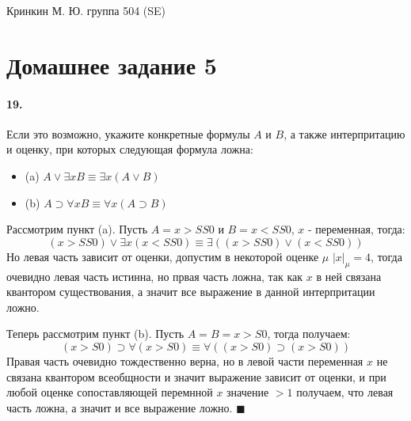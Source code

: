 \documentclass[a4paper,12pt]{article}
\begin{document}
\sloppy

\lstset{
	basicstyle=\small,
	stringstyle=\ttfamily,
	showstringspaces=false,
	columns=fixed,
	breaklines=true,
	numbers=right,
	numberstyle=\tiny
}

\newtheorem{Def}{Определение}[section]
\newtheorem{Th}{Теорема}
\newtheorem{Lem}[Th]{Лемма}
\newenvironment{Proof}
	{\par\noindent{\bf Доказательство.}}
	{\hfill$\scriptstyle\blacksquare$}
\newenvironment{Solution}
	{\par\noindent{\bf Решение.}}
	{\hfill$\scriptstyle\blacksquare$}


\begin{flushright}
	Кринкин М. Ю. группа 504 (SE)
\end{flushright}

\section{Домашнее задание 5}

\paragraph{19.} Если это возможно, укажите конкретные формулы $A$ и $B$, а также интерпритацию и оценку, при которых следующая формула ложна:

\begin{itemize}
\item (a) $A \lor \exists x B \equiv \exists x \left(A \lor B\right)$

\item (b) $A \supset \forall x B \equiv \forall x \left(A \supset B\right)$
\end{itemize}

\begin{Solution}
Рассмотрим пункт (a). Пусть $A = x > SS0$ и $B = x < SS0$, $x$ - переменная, тогда:
\[
	\left(x>SS0\right)\lor\exists x \left(x<SS0\right)\equiv\exists \left(\left(x>SS0\right)\lor\left(x<SS0\right)\right)
\]
Но левая часть зависит от оценки, допустим в некоторой оценке $\mu$ $\left|x\right|_{\mu} = 4$, тогда очевидно левая часть истинна, но првая часть ложна, так как $x$ в ней связана квантором существования, а значит все выражение в данной интерпритации ложно.

Теперь рассмотрим пункт (b). Пусть $A = B = x > S0$, тогда получаем:
\[
	\left(x > S0\right) \supset \forall \left(x > S0\right) \equiv \forall \left(\left(x > S0\right) \supset \left(x > S0\right)\right)
\]
Правая часть очевидно тождественно верна, но в левой части переменная $x$ не связана квантором всеобщности и значит выражение зависит от оценки, и при любой оценке сопоставляющей перемнной $x$ значение $> 1$ получаем, что левая часть ложна, а значит и все выражение ложно.
\end{Solution}
\end{document}

